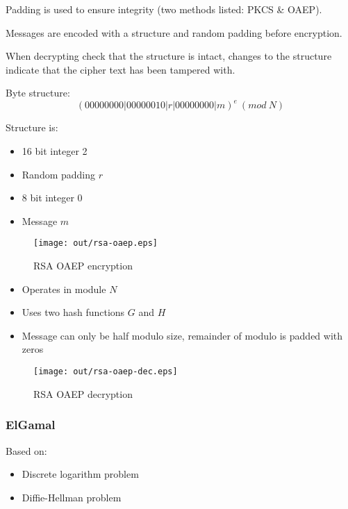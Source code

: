 \documentclass[a4paper]{article}
\begin{document}
Padding is used to ensure integrity (two methods listed: PKCS \& OAEP).

Messages are encoded with a structure and random padding before encryption.

When decrypting check that the structure is intact, changes to the structure
indicate that the cipher text has been tampered with.


Byte structure:
\[
  (00000000|00000010|r|00000000|m)^{e} \: (mod \: N)
\]

Structure is:
\begin{itemize}
  \item 16 bit integer 2
  \item Random padding $r$
  \item 8 bit integer 0
  \item Message $m$
\end{itemize}


\begin{figure}[h!]
  \centering
  \texttt{[image: out/rsa-oaep.eps]}
  \caption{RSA OAEP encryption}
  \label{fig:rsa-oaep}
\end{figure}
\FloatBarrier

\begin{itemize}
  \item Operates in module $N$
  \item Uses two hash functions $G$ and $H$
  \item Message can only be half modulo size, remainder of modulo is padded with
        zeros
\end{itemize}

\begin{figure}[h!]
  \centering
  \texttt{[image: out/rsa-oaep-dec.eps]}
  \caption{RSA OAEP decryption}
  \label{fig:rsa-oaep-dec}
\end{figure}
\FloatBarrier

\subsubsection{ElGamal}

Based on:
\begin{itemize}
  \item Discrete logarithm problem
  \item Diffie-Hellman problem
\end{itemize}
\end{document}
